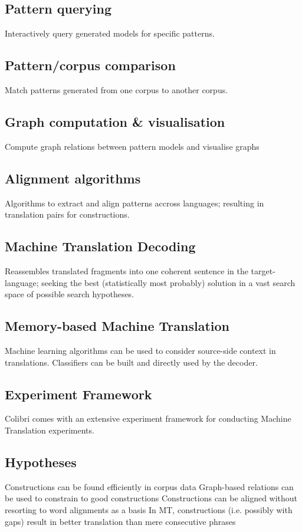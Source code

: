 \documentclass[12pt]{article}
\begin{document}
\subsection{Pattern querying} Interactively query generated models for specific patterns.
\subsection{Pattern/corpus comparison} Match patterns generated from one corpus to another corpus.
\subsection{Graph computation \& visualisation} Compute graph relations between pattern models and visualise graphs
\subsection{Alignment algorithms} Algorithms to extract and align patterns accross languages; resulting in translation pairs for constructions.
\subsection{Machine Translation Decoding} Reassembles translated fragments into one coherent sentence in the target-language; seeking the best (statistically most probably) solution in a vast search space of possible search hypotheses.
\subsection{Memory-based Machine Translation} Machine learning algorithms can be used to consider source-side context in translations. Classifiers can be built and directly used by the decoder.
\subsection{Experiment Framework} Colibri comes with an extensive experiment framework for conducting Machine Translation experiments.\

\subsection{Hypotheses} %

Constructions can be found efficiently in corpus data
Graph-based relations can be used to constrain to good constructions
Constructions can be aligned without resorting to word alignments as a basis
In MT, constructions (i.e. possibly with gaps) result in better translation than mere consecutive phrases
\end{document}

